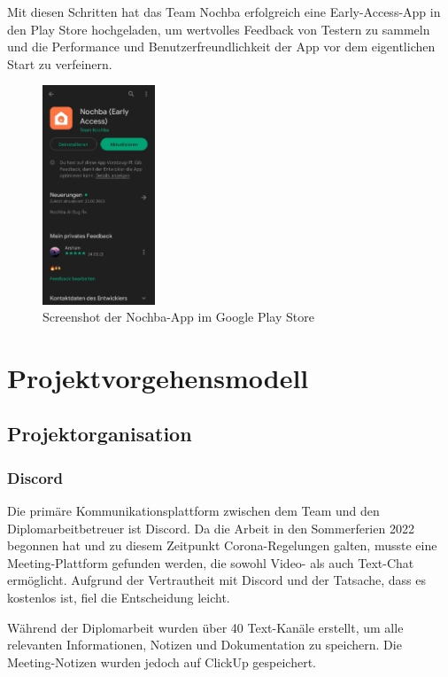 Mit diesen Schritten hat das Team Nochba erfolgreich eine Early-Access-App in den Play Store hochgeladen, um wertvolles Feedback von Testern zu sammeln und die Performance und Benutzerfreundlichkeit der App vor dem eigentlichen Start zu verfeinern.

\begin{figure}[H]
    \centering
    \includegraphics[width=0.3\textwidth]{pics/Nochba-Google_Play_Store.jpg}
    \caption{Screenshot der Nochba-App im Google Play Store}
    \label{fig:Nochba-GooglePlayStore}
\end{figure}

\section{Projektvorgehensmodell}
\subsection{Projektorganisation}

\subsubsection{Discord}
Die primäre Kommunikationsplattform zwischen dem Team und den Diplomarbeitbetreuer ist Discord. Da die Arbeit in den Sommerferien 2022 begonnen hat und zu diesem Zeitpunkt Corona-Regelungen galten, musste eine Meeting-Plattform gefunden werden, die sowohl Video- als auch Text-Chat ermöglicht. Aufgrund der Vertrautheit mit Discord und der Tatsache, dass es kostenlos ist, fiel die Entscheidung leicht.

Während der Diplomarbeit wurden über 40 Text-Kanäle erstellt, um alle relevanten Informationen, Notizen und Dokumentation zu speichern. Die Meeting-Notizen wurden jedoch auf ClickUp gespeichert.
